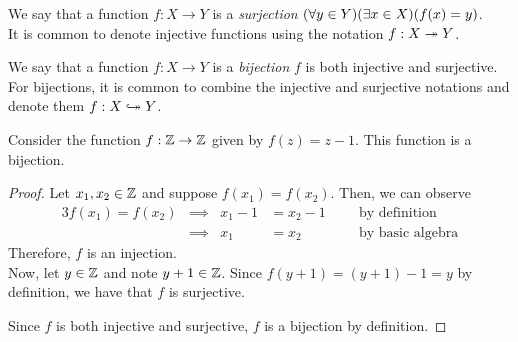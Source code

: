 \begin{definition}[Surjectivity]
    We say that a function $f: X \to Y$ is a \emph{surjection}
    \iffbydefn $\pn*{\forall y \in Y}\pn*{\exists x \in X}\pn*{f(x) = y}$.\\
    It is common to denote injective functions using the notation $f: X \twoheadrightarrow Y$.
\end{definition}

\begin{definition}[Bijectivity]
    We say that a function $f: X \to Y$ is a \emph{bijection}
    \iffbydefn $f$ is both injective and surjective.\\
    For bijections,
    it is common to combine the injective and surjective notations and denote them $f: X \bijection Y$.
\end{definition}

\begin{example}
    Consider the function $f: \mathbb{Z} \to \mathbb{Z}$ given by $f(z) = z - 1$.
    This function is a bijection.
\end{example}
\begin{proof}
    Let $x_1, x_2 \in \mathbb{Z}$ and suppose $f(x_1) = f(x_2)$.
    Then, we can observe
    \begin{alignat*}{3}
        f(x_1) = f(x_2) &\implies & x_1 - 1 &= x_2 - 1 &~~&\text{ by definition}\\
                        &\implies & x_1 &= x_2 &&\text{ by basic algebra}
    \end{alignat*}
    Therefore, $f$ is an injection.\\
    Now, let $y \in \mathbb{Z}$ and note $y + 1 \in \mathbb{Z}$.
    Since $f(y + 1) = (y + 1) - 1 = y$ by definition, we have that $f$ is surjective.

    Since $f$ is both injective and surjective, $f$ is a bijection by definition.
\end{proof}

